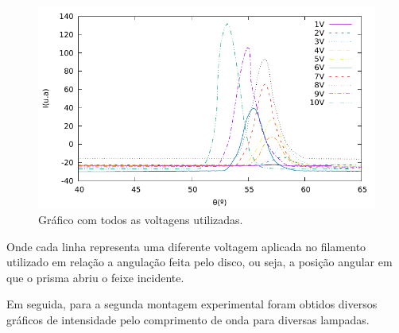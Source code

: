 \begin{figure}[!htb]
	\centering
		\includegraphics[scale= 1.2]{fig/All.pdf}
	\caption{Gráfico com todos as voltagens utilizadas.}
	\label{fig:All}
\end{figure}


Onde cada linha representa uma diferente voltagem aplicada no filamento utilizado em relação a angulação feita pelo disco, ou seja, a posição angular em que o prisma abriu o feixe incidente.


Em seguida, para a segunda montagem experimental foram obtidos diversos gráficos de intensidade pelo comprimento de onda para diversas lampadas.

